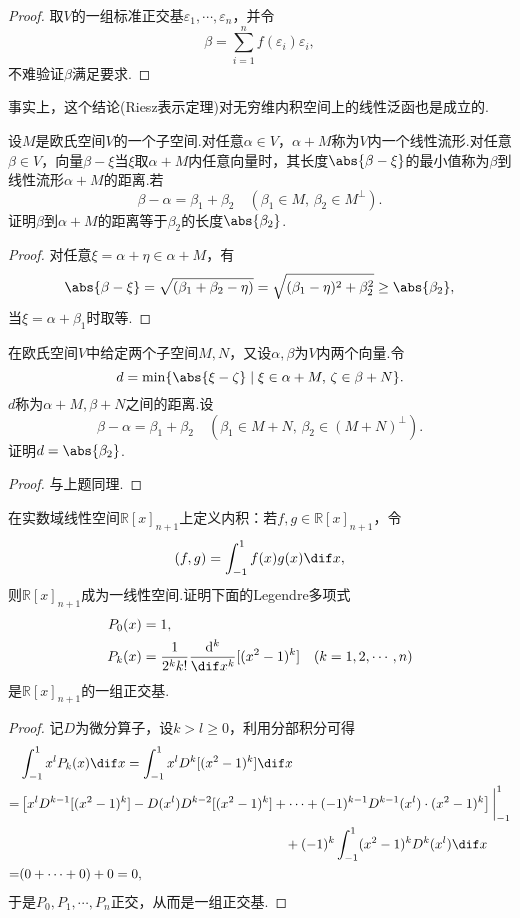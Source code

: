 \begin{proof}
	取$V$的一组标准正交基$\varepsilon_1,\cdots,\varepsilon_n$，并令
	\[
		\beta=\sum_{i=1}^{n}f(\varepsilon_i)\varepsilon_i,
	\]
	不难验证$\beta$满足要求.
\end{proof}
\begin{note}
	事实上，这个结论\textnormal{({\kaishu Riesz表示定理})}对无穷维内积空间上的线性泛函也是成立的.
\end{note}
\begin{prob}[21]
	设$M$是欧氏空间$V$的一个子空间.对任意$\alpha\in V$，$\alpha+M$称为$V$内一个{\heiti 线性流形}.对任意$\beta\in V$，向量$\beta-\xi$当$\xi$取$\alpha+M$内任意向量时，其长度$\abs{\beta-\xi}$的最小值称为$\beta$到线性流形$\alpha+M$的{\heiti 距离}.若
	\[
		\beta-\alpha=\beta_1+\beta_2\quad (\beta_1\in M,\,\beta_2\in M^{\perp}).
	\]
	证明$\beta$到$\alpha+M$的距离等于$\beta_2$的长度$\abs{\beta_2}$.
\end{prob}
\begin{proof}
	对任意$\xi=\alpha+\eta\in \alpha+M$，有
	\[
		\abs{\beta-\xi}=\sqrt{(\beta_1+\beta_2-\eta)}=\sqrt{(\beta_1-\eta)^2+\beta_2^2}\ge\abs{\beta_2},
	\]
	当$\xi=\alpha+\beta_1$时取等.
\end{proof}
\begin{prob}[22]
	在欧氏空间$V$中给定两个子空间$M,N$，又设$\alpha,\beta$为$V$内两个向量.令
	\[
		d=\min\{\abs{\xi-\zeta}\mid\xi\in \alpha+M,\,\zeta\in\beta+N\}.
	\]
	$d$称为$\alpha+M,\beta+N$之间的{\heiti 距离}.设
	\[
		\beta-\alpha=\beta_1+\beta_2\quad(\beta_1\in M+N,\,\beta_2\in(M+N)^\perp).
	\]
	证明$d=\abs{\beta_2}$.
\end{prob}
\begin{proof}
	与上题同理.
\end{proof}
\begin{prob}[23]
	在实数域线性空间$\mathbb{R}[x]_{n+1}$上定义内积：若$f,g\in\mathbb{R}[x]_{n+1}$，令
	\[
		(f,g)=\int_{-1}^1f(x)g(x)\dif x,
	\]
	则$\mathbb{R}[x]_{n+1}$成为一线性空间.证明下面的Legendre多项式
	\begin{align*}
		P_0(x) & =1,                                                                           \\
		P_k(x) & =\frac{1}{2^kk!}\frac{\mathrm{d}^k}{\dif x^k}[(x^2-1)^k]\quad(k=1,2,\cdots,n)
	\end{align*}
	是$\mathbb{R}[x]_{n+1}$的一组正交基.
\end{prob}
\begin{proof}
	记$D$为微分算子，设$k>l\ge0$，利用分部积分可得
	\begin{align*}
		  & {}\int_{-1}^1x^lP_k(x)\dif x=\int_{-1}^1x^lD^k[(x^2-1)^k]\dif x                                                        \\
		= & {}\left[x^lD^{k-1}[(x^2-1)^k]-D(x^l)D^{k-2}[(x^2-1)^k]+\cdots+(-1)^{k-1}D^{k-1}(x^l)\cdot(x^2-1)^k\right]\bigg|_{-1}^1 \\
		  & {}\hspace{20em}+(-1)^k\int_{-1}^1(x^2-1)^kD^k(x^l)\dif x                                                               \\
		= & {}(0+\cdots+0)+0=0,
	\end{align*}
	于是$P_0,P_1,\cdots,P_n$正交，从而是一组正交基.
\end{proof}
